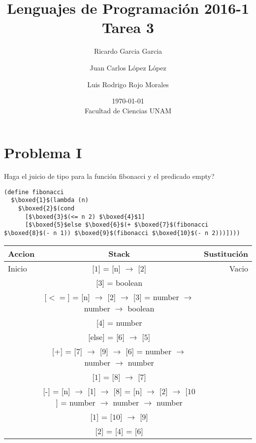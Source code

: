 \documentclass{article}
\title{Lenguajes de Programación 2016-1\\Tarea 3}
\author{Ricardo Garcia Garcia \and  Juan Carlos López López \and Luis Rodrigo Rojo Morales}
\date{\today\\ Facultad de Ciencias UNAM}
\begin{document}
\maketitle
\section*{Problema I}
Haga el juicio de tipo para la función fibonacci y el predicado empty?\\

\begin{lstlisting}
(define fibonacci
  $\boxed{1}$(lambda (n)
    $\boxed{2}$(cond
      [$\boxed{3}$(<= n 2) $\boxed{4}$1]
      [$\boxed{5}$else $\boxed{6}$(+ $\boxed{7}$(fibonacci $\boxed{8}$(- n 1)) $\boxed{9}$(fibonacci $\boxed{10}$(- n 2)))])))
\end{lstlisting}

\begin{center}
 \begin{tabular}{ | l | c | r | }
  \hline
  Accion & Stack & Sustitución \\ \hline \hline
  Inicio & [$\boxed{1}$] = [n] $\rightarrow$ [$\boxed{2}$] 									& Vacio	\\
	 & [$\boxed{3}$] = boolean		     										&   	\\
	 & [$<=$] = [n] $\rightarrow$ [2] $\rightarrow$ [$\boxed{3}$] = 
	 number $\rightarrow$ number $\rightarrow$ boolean									& 	\\ 
	 & [$\boxed{4}$] = number												&	\\ 
	 & [else] = [$\boxed{6}$] $\rightarrow$ [$\boxed{5}$]									&	\\
	 & [+] = [$\boxed{7}$] $\rightarrow$ [$\boxed{9}$] $\rightarrow$ [$\boxed{6}$] = 
	 number $\rightarrow$ number $\rightarrow$ number									&	\\ 
	 & [$\boxed{1}$] = [$\boxed{8}$] $\rightarrow$ [$\boxed{7}$]								&	\\
	 & [-] = [n] $\rightarrow$ [1] $\rightarrow$ [$\boxed{8}$] = [n] $\rightarrow$ [2] $\rightarrow$ [$\boxed{10}$] =
	   number $\rightarrow$ number $\rightarrow$ number									&	\\
	 & [$\boxed{1}$] = [$\boxed{10}$] $\rightarrow$ [$\boxed{9}$] 								&	\\ 
	 & [$\boxed{2}$] = [$\boxed{4}$] = [$\boxed{6}$]									&	\\ \hline
 \end{tabular}

\end{center}
\end{document}
